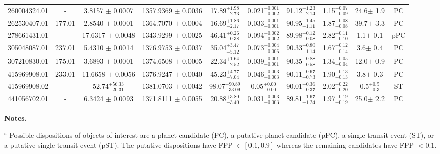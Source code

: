 \begin{landscape}
\begin{table*}
\begin{tabular}{cccccccccc}
    260004324.01 & - & 3.8157 $\pm$ 0.0007 & 1357.9369 $\pm$ 0.0036 & 17.89$^{+1.98}_{-2.73}$ & 0.021$^{+0.001}_{-0.002}$ & 91.12$^{+1.23}_{-2.14}$ & 1.15$^{+0.07}_{-0.09}$ & 24.6$\pm$ 1.9 & PC \\ 
    262530407.01 & 177.01 & 2.8540 $\pm$ 0.0001 & 1364.7070 $\pm$ 0.0004 & 16.69$^{+1.86}_{-2.17}$ & 0.033$^{+0.001}_{-0.001}$ & 90.95$^{+1.45}_{-1.11}$ & 1.87$^{+0.08}_{-0.08}$ & 39.7$\pm$ 3.3 & PC \\ 
    278661431.01 & - & 17.6317 $\pm$ 0.0048 & 1343.9299 $\pm$ 0.0025 & 46.41$^{+0.26}_{-0.38}$ & 0.094$^{+0.002}_{-0.002}$ & 89.98$^{+0.12}_{-0.08}$ & 2.82$^{+0.11}_{-0.10}$ & 1.1$\pm$ 0.1 & pPC \\ 
    305048087.01 & 237.01 & 5.4310 $\pm$ 0.0014 & 1376.9753 $\pm$ 0.0037 & 35.04$^{+3.47}_{-5.12}$ & 0.073$^{+0.004}_{-0.006}$ & 90.33$^{+0.80}_{-1.14}$ & 1.67$^{+0.12}_{-0.14}$ & 3.6$\pm$ 0.4 & PC \\ 
    307210830.01 & 175.01 & 3.6893 $\pm$ 0.0001 & 1374.6508 $\pm$ 0.0005 & 22.34$^{+1.64}_{-2.52}$ & 0.039$^{+0.001}_{-0.001}$ & 90.35$^{+0.88}_{-0.58}$ & 1.34$^{+0.05}_{-0.04}$ & 12.0$\pm$ 0.9 & PC \\ 
    415969908.01 & 233.01 & 11.6658 $\pm$ 0.0056 & 1376.9247 $\pm$ 0.0040 & 45.23$^{+4.77}_{-7.04}$ & 0.046$^{+0.003}_{-0.003}$ & 90.11$^{+0.67}_{-0.73}$ & 1.90$^{+0.13}_{-0.13}$ & 3.8$\pm$ 0.3 & PC \\ 
    415969908.02 & - & 52.74$^{+56.33}_{-20.31}$ & 1381.0703 $\pm$ 0.0042 & 98.07$^{+90.89}_{-33.09}$ & 0.05$^{+0.00}_{-0.00}$ & 90.01$^{+0.36}_{-0.37}$ & 2.02$^{+0.22}_{-0.20}$ & 0.5$^{+0.5}_{-0.3}$ & ST \\ 
    441056702.01 & - & 6.3424 $\pm$ 0.0093 & 1371.8111 $\pm$ 0.0055 & 20.88$^{+3.80}_{-3.40}$ & 0.031$^{+0.003}_{-0.003}$ & 89.81$^{+1.67}_{-1.24}$ & 1.97$^{+0.19}_{-0.19}$ & 25.0$\pm$ 2.2 & PC \\ 
  \end{tabular}
  \begin{list}{}{}
  \item {\bf{Notes.}}
    \item $^{\text{a}}$ Possible dispositions of objects of interest are a planet candidate (PC), a putative planet candidate (pPC), a single transit event (ST), or a putative single transit event (pST). The putative dispositions have FPP $\in [0.1,0.9]$ whereas the remaining candidates have FPP $<0.1$.
  \end{list}
\end{table*}
\clearpage
\end{landscape}
